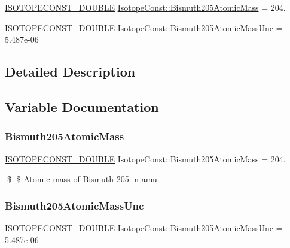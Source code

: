 \begin{DoxyCompactItemize}
\item 
\mbox{\hyperlink{group___isotope_const-_macros_ga8f45a7272ce02c0b4c65c44636ed719a}{I\+S\+O\+T\+O\+P\+E\+C\+O\+N\+S\+T\+\_\+\+D\+O\+U\+B\+LE}} \mbox{\hyperlink{group___isotope_const-_bismuth-_bi205_ga80b968c564eb9efb97dfdcf9b19f6eb3}{Isotope\+Const\+::\+Bismuth205\+Atomic\+Mass}} = 204.
\item 
\mbox{\hyperlink{group___isotope_const-_macros_ga8f45a7272ce02c0b4c65c44636ed719a}{I\+S\+O\+T\+O\+P\+E\+C\+O\+N\+S\+T\+\_\+\+D\+O\+U\+B\+LE}} \mbox{\hyperlink{group___isotope_const-_bismuth-_bi205_gaeaecdd8729bffe9efd66460afd4a76b6}{Isotope\+Const\+::\+Bismuth205\+Atomic\+Mass\+Unc}} = 5.\+487e-\/06
\end{DoxyCompactItemize}


\subsection{Detailed Description}


\subsection{Variable Documentation}
\mbox{\label{group___isotope_const-_bismuth-_bi205_ga80b968c564eb9efb97dfdcf9b19f6eb3}} 
\subsubsection{\texorpdfstring{Bismuth205\+Atomic\+Mass}{Bismuth205AtomicMass}}
{\footnotesize\ttfamily \mbox{\hyperlink{group___isotope_const-_macros_ga8f45a7272ce02c0b4c65c44636ed719a}{I\+S\+O\+T\+O\+P\+E\+C\+O\+N\+S\+T\+\_\+\+D\+O\+U\+B\+LE}} Isotope\+Const\+::\+Bismuth205\+Atomic\+Mass = 204.}

\$ \$ Atomic mass of Bismuth-\/205 in amu. \mbox{\label{group___isotope_const-_bismuth-_bi205_gaeaecdd8729bffe9efd66460afd4a76b6}} 
\subsubsection{\texorpdfstring{Bismuth205\+Atomic\+Mass\+Unc}{Bismuth205AtomicMassUnc}}
{\footnotesize\ttfamily \mbox{\hyperlink{group___isotope_const-_macros_ga8f45a7272ce02c0b4c65c44636ed719a}{I\+S\+O\+T\+O\+P\+E\+C\+O\+N\+S\+T\+\_\+\+D\+O\+U\+B\+LE}} Isotope\+Const\+::\+Bismuth205\+Atomic\+Mass\+Unc = 5.\+487e-\/06}

